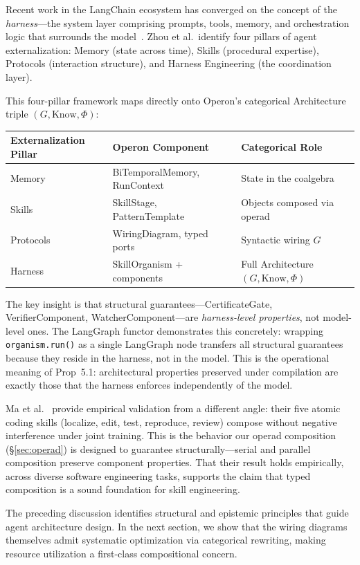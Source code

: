 Recent work in the LangChain ecosystem has converged on the concept of the \emph{harness}---the system layer comprising prompts, tools, memory, and orchestration logic that surrounds the model~\cite{zhou2026externalization}.  Zhou et al.\ identify four pillars of agent externalization: Memory (state across time), Skills (procedural expertise), Protocols (interaction structure), and Harness Engineering (the coordination layer).

This four-pillar framework maps directly onto Operon's categorical Architecture triple $(G, \mathrm{Know}, \Phi)$:

\begin{center}
\small
\begin{tabular}{@{}lll@{}}
\toprule
\textbf{Externalization Pillar} & \textbf{Operon Component} & \textbf{Categorical Role} \\
\midrule
Memory & BiTemporalMemory, RunContext & State in the coalgebra \\
Skills & SkillStage, PatternTemplate & Objects composed via operad \\
Protocols & WiringDiagram, typed ports & Syntactic wiring $G$ \\
Harness & SkillOrganism + components & Full Architecture $(G, \mathrm{Know}, \Phi)$ \\
\bottomrule
\end{tabular}
\end{center}

The key insight is that structural guarantees---CertificateGate, VerifierComponent, WatcherComponent---are \emph{harness-level properties}, not model-level ones.  The LangGraph functor demonstrates this concretely: wrapping \texttt{organism.run()} as a single LangGraph node transfers all structural guarantees because they reside in the harness, not in the model.  This is the operational meaning of Prop~5.1: architectural properties preserved under compilation are exactly those that the harness enforces independently of the model.

Ma et al.~\cite{ma2026atomic} provide empirical validation from a different angle: their five atomic coding skills (localize, edit, test, reproduce, review) compose without negative interference under joint training.  This is the behavior our operad composition (\S\ref{sec:operad}) is designed to guarantee structurally---serial and parallel composition preserve component properties.  That their result holds empirically, across diverse software engineering tasks, supports the claim that typed composition is a sound foundation for skill engineering.

The preceding discussion identifies structural and epistemic principles that guide agent architecture design. In the next section, we show that the wiring diagrams themselves admit systematic optimization via categorical rewriting, making resource utilization a first-class compositional concern.
